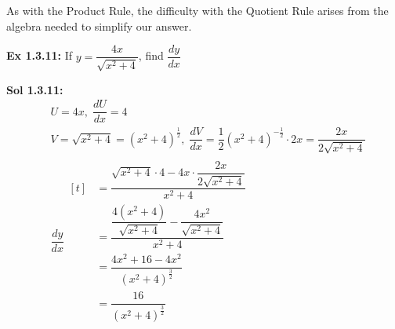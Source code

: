 As with the Product Rule, the difficulty with the Quotient Rule arises from the algebra needed to simplify our answer. \par

\begin{tcolorbox}[example]
    \textbf{Ex 1.3.11: } If $y = \dfrac{4x}{\sqrt{x^2 + 4}}$, find $\dfrac{dy}{dx}$ 
\end{tcolorbox}
\begin{tcolorbox}[solution]
    \textbf{Sol 1.3.11: } \begin{align*}
        & U = 4x, \; \dfrac{dU}{dx} = 4 \\[11pt]
        & V = \sqrt{x^2 + 4} = \left(x^2 + 4\right)^\frac{1}{2}, \; \dfrac{dV}{dx} = \dfrac{1}{2}\left(x^2 + 4\right)^{-\frac{1}{2}} \cdot 2x = \dfrac{2x}{2\sqrt{x^2 + 4}} \\[11pt]
        & \dfrac{dy}{dx} \begin{aligned}[t]
            & = \dfrac{\sqrt{x^2 + 4} \cdot 4 - 4x \cdot \dfrac{2x}{2\sqrt{x^2 + 4}}}{x^2 + 4} \\[11pt]
            & = \dfrac{\dfrac{4\left(x^2 + 4\right)}{\sqrt{x^2 + 4}} - \dfrac{4x^2}{\sqrt{x^2 + 4}}}{x^2 + 4} \\[11pt]
            & = \dfrac{4x^2 + 16 - 4x^2}{\left(x^2 + 4\right)^\frac{3}{2}} \\[11pt]
            & = \boxed{\dfrac{16}{\left(x^2 + 4\right)^\frac{3}{2}}}
        \end{aligned}
    \end{align*}
\end{tcolorbox} \vspace{11pt}

